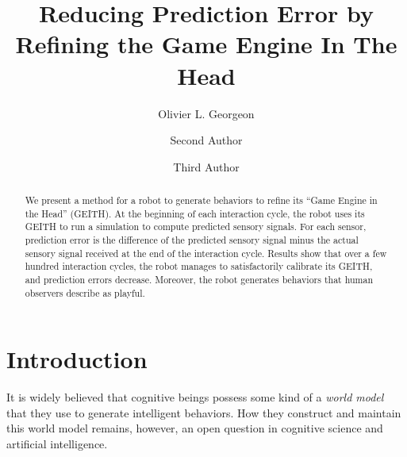 \documentclass[runningheads]{llncs}
\begin{document}
%
\title{Reducing Prediction Error by Refining the Game Engine In The Head}
%
%
\author{Olivier L. Georgeon \and
Second Author \and
Third Author}
%
%
%
\maketitle              %
%
\begin{abstract}
We present a method for a robot to generate behaviors to refine its ``Game Engine in the Head'' (GEITH).
At the beginning of each interaction cycle, the robot uses its GEITH to run a simulation to compute predicted sensory signals. 
For each sensor, prediction error is the difference of the predicted sensory signal minus the actual sensory signal received at the end of the interaction cycle. 
Results show that over a few hundred interaction cycles, the robot manages to satisfactorily calibrate its GEITH, and prediction errors decrease. 
Moreover, the robot generates behaviors that human observers describe as playful.

\end{abstract}
%
%
%
\section{Introduction}

It is widely believed that cognitive beings possess some kind of a \textit{world model} that they use to generate intelligent behaviors.
How they construct and maintain this world model remains, however,  an open question in cognitive science and artificial intelligence. 
\end{document}
